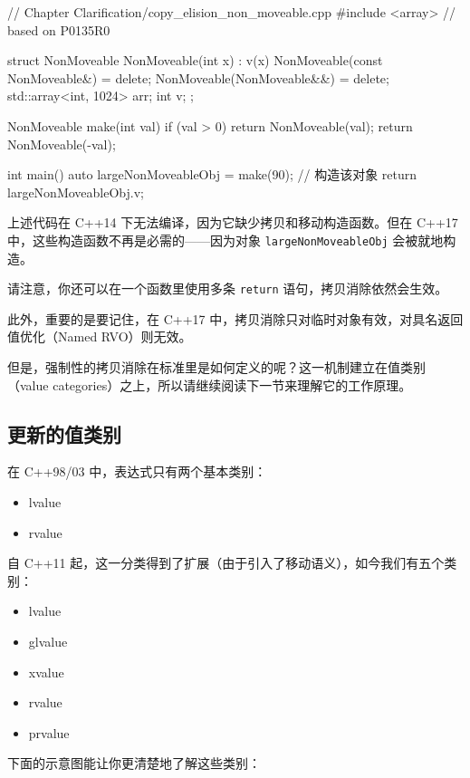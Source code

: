 \begin{codebox}[cpp]
// Chapter Clarification/copy_elision_non_moveable.cpp
#include <array>
// based on P0135R0

struct NonMoveable
{
    NonMoveable(int x) : v(x) { }
    NonMoveable(const NonMoveable&) = delete;
    NonMoveable(NonMoveable&&) = delete;
    std::array<int, 1024> arr;
    int v;
};

NonMoveable make(int val)
{
    if (val > 0)
        return NonMoveable(val);
    return NonMoveable(-val);
}

int main()
{
    auto largeNonMoveableObj = make(90); // 构造该对象
    return largeNonMoveableObj.v;
}
\end{codebox}

上述代码在 C++14 下无法编译，因为它缺少拷贝和移动构造函数。但在 C++17 中，这些构造函数不再是必需的——因为对象 \texttt{largeNonMoveableObj} 会被就地构造。

请注意，你还可以在一个函数里使用多条 \texttt{return} 语句，拷贝消除依然会生效。

此外，重要的是要记住，在 C++17 中，拷贝消除只对临时对象有效，对具名返回值优化（Named RVO）则无效。

但是，强制性的拷贝消除在标准里是如何定义的呢？这一机制建立在值类别（value categories）之上，所以请继续阅读下一节来理解它的工作原理。

\subsection{更新的值类别}

在 C++98/03 中，表达式只有两个基本类别：

\begin{itemize}
\item lvalue
\item rvalue
\end{itemize}

自 C++11 起，这一分类得到了扩展（由于引入了移动语义），如今我们有五个类别：

\begin{itemize}
\item lvalue
\item glvalue
\item xvalue
\item rvalue
\item prvalue
\end{itemize}

下面的示意图能让你更清楚地了解这些类别：



